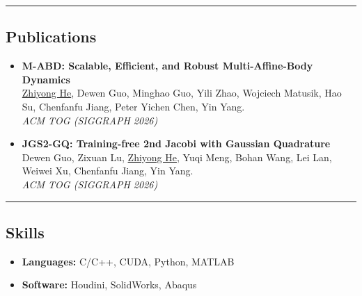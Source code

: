 \documentclass[11pt,letterpaper]{article}
\begin{document}
\hrule
\vspace{-1em}
\subsection*{\Large Publications}
\begin{itemize}[leftmargin=1em]
	\parskip=0.3em
	\item
	      {\textbf{M-ABD: Scalable, Efficient, and Robust Multi-Affine-Body Dynamics}}\\
	      \underline{Zhiyong He}, Dewen Guo, Minghao Guo, Yili Zhao, Wojciech Matusik, Hao Su, Chenfanfu Jiang, Peter Yichen Chen, Yin Yang.\\
	      \emph{ACM TOG (SIGGRAPH 2026)}
	\item
	      {\textbf{JGS2-GQ: Training-free 2nd Jacobi with Gaussian Quadrature}}\\
	      Dewen Guo, Zixuan Lu, \underline{Zhiyong He}, Yuqi Meng, Bohan Wang, Lei Lan, Weiwei Xu, Chenfanfu Jiang, Yin Yang.\\
	      \emph{ACM TOG (SIGGRAPH 2026)}
\end{itemize}

\hrule
\vspace{-1em}
\subsection*{\Large Skills}

\begin{itemize}[leftmargin=1em,noitemsep]
	\item \textbf{Languages:} C/C++, CUDA, Python, MATLAB
	\item \textbf{Software:} Houdini, SolidWorks, Abaqus
\end{itemize}
\end{document}
